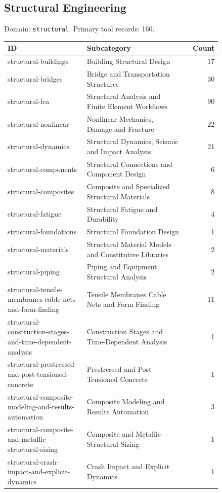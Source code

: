 \subsection{Structural Engineering}
\noindent Domain: \texttt{structural}. Primary tool records: 160.
\begin{longtable}{p{0.37\linewidth}p{0.47\linewidth}r}
ID & Subcategory & Count\\\hline\endhead
structural-buildings & Building Structural Design & 17\\
structural-bridges & Bridge and Transportation Structures & 30\\
structural-fea & Structural Analysis and Finite Element Workflows & 90\\
structural-nonlinear & Nonlinear Mechanics, Damage and Fracture & 22\\
structural-dynamics & Structural Dynamics, Seismic and Impact Analysis & 21\\
structural-components & Structural Connections and Component Design & 6\\
structural-composites & Composite and Specialized Structural Materials & 8\\
structural-fatigue & Structural Fatigue and Durability & 4\\
structural-foundations & Structural Foundation Design & 1\\
structural-materials & Structural Material Models and Constitutive Libraries & 2\\
structural-piping & Piping and Equipment Structural Analysis & 2\\
structural-tensile-membranes-cable-nets-and-form-finding & Tensile Membranes Cable Nets and Form Finding & 11\\
structural-construction-stages-and-time-dependent-analysis & Construction Stages and Time-Dependent Analysis & 1\\
structural-prestressed-and-post-tensioned-concrete & Prestressed and Post-Tensioned Concrete & 1\\
structural-composite-modeling-and-results-automation & Composite Modeling and Results Automation & 3\\
structural-composite-and-metallic-structural-sizing & Composite and Metallic Structural Sizing & 1\\
structural-crash-impact-and-explicit-dynamics & Crash Impact and Explicit Dynamics & 1\\
\end{longtable}
